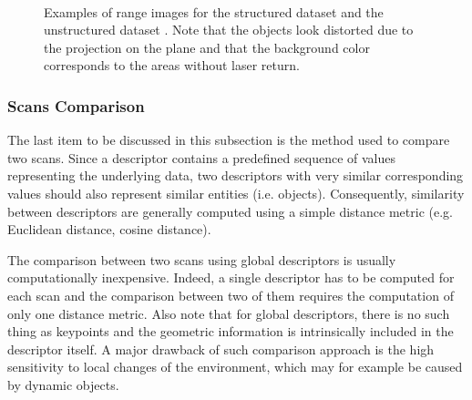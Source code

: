 \begin{figure}[H]
    \centering
    \\
    \caption{Examples of range images for the structured dataset \protect{} and the unstructured dataset \protect{}. Note that the objects look distorted due to the projection on the plane and that the background color corresponds to the areas without laser return.}
    \label{fig:chap_slam_range}
\end{figure}

\subsubsection{Scans Comparison}
\label{ssub:scans_comparison}

The last item to be discussed in this subsection is the method used to compare two scans. Since a descriptor contains a predefined sequence of values representing the underlying data, two descriptors with very similar corresponding values should also represent similar entities (i.e. objects). Consequently, similarity between descriptors are generally computed using a simple distance metric (e.g. Euclidean distance, cosine distance).

The comparison between two scans using global descriptors is usually computationally inexpensive. Indeed, a single descriptor has to be computed for each scan and the comparison between two of them requires the computation of only one distance metric. Also note that for global descriptors, there is no such thing as keypoints and the geometric information is intrinsically included in the descriptor itself. A major drawback of such comparison approach is the high sensitivity to local changes of the environment, which may for example be caused by dynamic objects.

